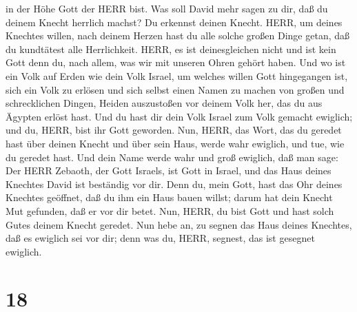 in der Höhe Gott der HERR bist.  Was soll David mehr sagen
zu dir, daß du deinem Knecht herrlich machst? Du erkennst deinen Knecht.
 HERR, um deines Knechtes willen, nach deinem Herzen hast
du alle solche großen Dinge getan, daß du kundtätest alle Herrlichkeit.
 HERR, es ist deinesgleichen nicht und ist kein Gott denn
du, nach allem, was wir mit unseren Ohren gehört haben. 
Und wo ist ein Volk auf Erden wie dein Volk Israel, um welches willen
Gott hingegangen ist, sich ein Volk zu erlösen und sich selbst einen
Namen zu machen von großen und schrecklichen Dingen, Heiden auszustoßen
vor deinem Volk her, das du aus Ägypten erlöst hast.  Und
du hast dir dein Volk Israel zum Volk gemacht ewiglich; und du, HERR,
bist ihr Gott geworden.  Nun, HERR, das Wort, das du
geredet hast über deinen Knecht und über sein Haus, werde wahr ewiglich,
und tue, wie du geredet hast.  Und dein Name werde wahr und
groß ewiglich, daß man sage: Der HERR Zebaoth, der Gott Israels, ist
Gott in Israel, und das Haus deines Knechtes David ist beständig vor
dir.  Denn du, mein Gott, hast das Ohr deines Knechtes
geöffnet, daß du ihm ein Haus bauen willst; darum hat dein Knecht Mut
gefunden, daß er vor dir betet.  Nun, HERR, du bist Gott
und hast solch Gutes deinem Knecht geredet.  Nun hebe an,
zu segnen das Haus deines Knechtes, daß es ewiglich sei vor dir; denn
was du, HERR, segnest, das ist gesegnet ewiglich.

\hypertarget{section-17}{%
\section{18}\label{section-17}}

